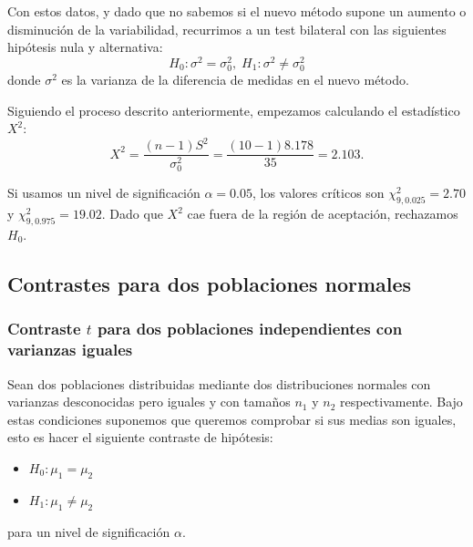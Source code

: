 \documentclass[a4paper,12pt]{article}
\begin{document}
    Con estos datos, y dado que no sabemos si el nuevo método supone un aumento o disminución de la variabilidad, recurrimos a un test bilateral con las siguientes hipótesis nula y alternativa:
    \begin{equation}
        H_0 : \sigma^2 = \sigma_0^2, \;
        H_1 : \sigma^2 \neq \sigma_0^2
    \end{equation}
    donde $\sigma^2$ es la varianza de la diferencia de medidas en el nuevo método.

    Siguiendo el proceso descrito anteriormente, empezamos calculando el estadístico $X^2$:
    \begin{equation}
        X^2
        =
        \frac{(n-1)S^2}{\sigma_0^2}
        =
        \frac{(10 - 1) 8.178}{35}
        =
        2.103
        .
    \end{equation}

    Si usamos un nivel de significación $\alpha = 0.05$, los valores críticos son $\chi^2_{9, 0.025} = 2.70$ y $\chi^2_{9,0.975} = 19.02$. 
    Dado que $X^2$ cae fuera de la región de aceptación, rechazamos $H_0$.





\subsection{Contrastes para dos poblaciones normales}

\subsubsection{Contraste $t$ para dos poblaciones independientes con varianzas iguales}
\label{sec:t_2samplessamevar}

    Sean dos poblaciones distribuidas mediante dos distribuciones normales con varianzas desconocidas pero iguales y con tamaños $n_1$ y $n_2$ respectivamente.
    Bajo estas condiciones suponemos que queremos comprobar si sus medias son iguales, esto es hacer el siguiente contraste de hipótesis:
\begin{itemize}
	\item $H_0:\mu_1=\mu_2$
	\item $H_1:\mu_1\neq \mu_2$
\end{itemize}
para un nivel de significación $\alpha$.
\end{document}
